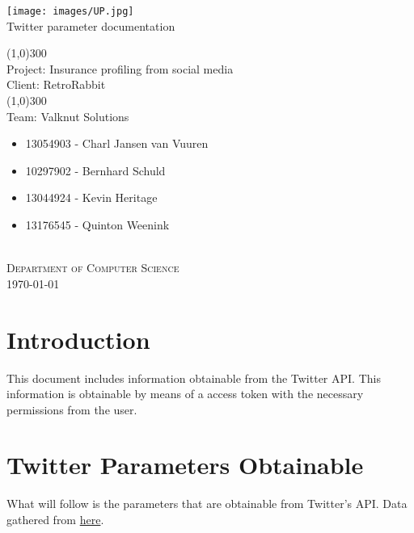 \documentclass{article}
\begin{document}
	\begin{titlepage}
		\begin{center}
			\texttt{[image: images/UP.jpg]}  \\
			[0.5cm]
			\huge{
			Twitter parameter documentation\\
			}
			
			\line(1,0){300}\\
			[0.2cm]
			\LARGE{Project: Insurance profiling from social media\\
			Client: RetroRabbit} \\
			\line(1,0){300}\\
			\LARGE{Team: Valknut Solutions}\\
			[1.0cm]
			\large
			{
			\begin{itemize}
				\item 13054903 - Charl Jansen van Vuuren 
				\item 10297902 - Bernhard Schuld      
				\item 13044924 - Kevin Heritage
				\item 13176545 - Quinton Weenink\\
			\end{itemize}
			}
			\textsc{\large}\\
		[3.0cm]
		\textsc{\large  Department of Computer Science}\\
		[0.5cm]
		\textsc{\large \today}\\
		\end{center}

	\end{titlepage}
	\cleardoublepage
	\tableofcontents
	\cleardoublepage
\section{Introduction}
	This document includes information obtainable from the Twitter API. This information is obtainable by means of a access token with the necessary permissions from the user.

\section{Twitter Parameters Obtainable}
	What will follow is the parameters that are obtainable from Twitter's API.
	Data gathered from \href{https://dev.twitter.com/rest/public}{here}.
\end{document}
